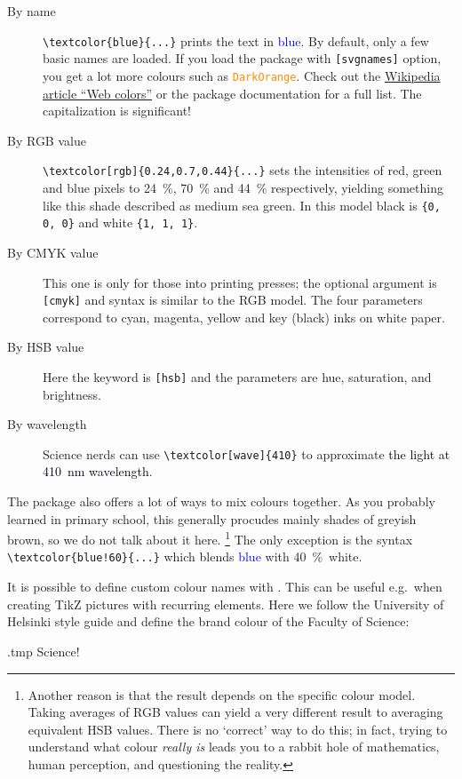 \begin{description}
\item[By name] \verb|\textcolor{blue}{...}| prints the text in \textcolor{blue}{blue}.
    By default, only a few basic names are loaded.
    If you load the package with \verb|[svgnames]| option,
    you get a lot more colours such as \textcolor{DarkOrange}{\texttt{DarkOrange}}.
    Check out the \href{https://en.wikipedia.org/wiki/Web_colors}{Wikipedia article ``Web colors''}
    or the package documentation for a full list.
    The capitalization is significant!
\item[By RGB value] \verb|\textcolor[rgb]{0.24,0.7,0.44}{...}|
    sets the intensities of red, green and blue pixels to 24~\%, 70~\% and 44~\% respectively,
    yielding something like \textcolor[rgb]{0.24,0.7,0.44}{this shade described as medium sea green}.
    In this model black is \verb|{0, 0, 0}| and white \verb|{1, 1, 1}|.
\item[By CMYK value] This one is only for those into printing presses;
    the optional argument is \verb|[cmyk]| and syntax is similar to the RGB model.
    The four parameters correspond to cyan, magenta, yellow and key (black) inks on white paper.
\item[By HSB value] Here the keyword is \verb|[hsb]|
    and the parameters are hue, saturation, and brightness.
\item[By wavelength]
    Science nerds can use \verb|\textcolor[wave]{410}|
    to approximate \textcolor[wave]{410}{the light at 410~nm wavelength}.
\end{description}

The package also offers a lot of ways to mix colours together.
As you probably learned in primary school,
this generally procudes mainly shades of greyish brown, so we do not talk about it here.%
\footnote{Another reason is that the result depends on the specific colour model.
Taking averages of RGB values can yield a very different result to averaging equivalent HSB values.
There is no `correct' way to do this;
in fact, trying to understand what colour \emph{really is}
leads you to a rabbit hole of mathematics, human perception, and questioning the reality.}
The only exception is the syntax \verb|\textcolor{blue!60}{...}|
which blends \textcolor{blue}{blue} with \textcolor{blue!60}{40~\%~white}.

It is possible to define custom colour names with .
This can be useful e.g.\ when creating TikZ pictures with recurring elements.
Here we follow the University of Helsinki style guide
and define the brand colour of the Faculty of Science:
%
\begin{VerbatimOut}{\jobname.tmp}
\textcolor{Sciency}{Science!}
\end{VerbatimOut}
\ShowExample

